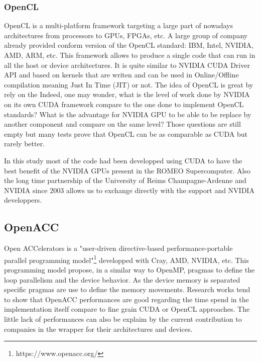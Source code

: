 \subsubsection{OpenCL}
OpenCL is a multi-platform framework targeting a large part of nowadays architectures from processors to GPUs, FPGAs, etc.
A large group of company already provided conform version of the OpenCL standard: IBM, Intel, NVIDIA, AMD, ARM, etc.
This framework allows to produce a single code that can run in all the host or device architectures. 
It is quite similar to NVIDIA CUDA Driver API and based on kernels that are writen and can be used in Online/Offline compilation meaning Just In Time (JIT) or not. 
The idea of OpenCL is great by rely on the 
Indeed, one may wonder, what is the level of work done by NVIDIA on its own CUDA framework compare to the one done to implement OpenCL standards? 
What is the advantage for NVIDIA GPU to be able to be replace by another component and compare on the same level? 
Those questions are still empty but many tests prove that OpenCL can be as comparable as CUDA but rarely better\cite{karimi2010performance,fang2011comprehensive}. 

In this study most of the code had been developped using CUDA to have the best benefit of the NVIDIA GPUs present in the ROMEO Supercomputer. 
Also the long time partnership of the University of Reims Champagne-Ardenne and NVIDIA since 2003 allows us to exchange directly with the support and NVIDIA developpers. 

\subsection{OpenACC}
Open ACCelerators is a "user-driven directive-based performance-portable parallel programming model"\footnote{https://www.openacc.org/} developped with Cray, AMD, NVIDIA, etc.
This programming model propose, in a similar way to OpenMP, pragmas to define the loop parallelism and the device behavior. 
As the device memory is separated specific pragmas are use to define the memory movements.
Research works\cite{wienke2012openacc} tend to show that OpenACC performances are good regarding the time spend in the implementation itself compare to fine grain CUDA or OpenCL approaches. 
The little lack of performances can also be explaim by the current contribution to companies in the wrapper for their architectures and devices. 

